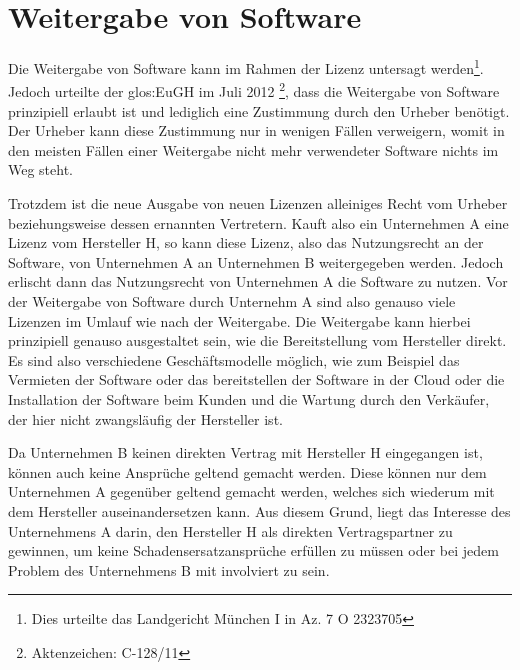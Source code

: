 \section{Weitergabe von Software}
Die Weitergabe von Software kann im Rahmen der Lizenz untersagt werden\footnote{Dies urteilte das Landgericht München I in Az. 7 O 23237\/05}.
Jedoch urteilte der \gls{glos:EuGH} im Juli 2012 \footnote{Aktenzeichen: C-128/11 }, dass die Weitergabe von Software prinzipiell erlaubt ist und lediglich eine Zustimmung durch den Urheber benötigt.
Der Urheber kann diese Zustimmung nur in wenigen Fällen verweigern, womit in den meisten Fällen einer Weitergabe nicht mehr verwendeter Software nichts im Weg steht.\par
Trotzdem ist die neue Ausgabe von neuen Lizenzen alleiniges Recht vom Urheber beziehungsweise dessen ernannten Vertretern.
Kauft also ein Unternehmen A eine Lizenz vom Hersteller H, so kann diese Lizenz, also das Nutzungsrecht an der Software, von Unternehmen A an Unternehmen B weitergegeben werden.
Jedoch erlischt dann das Nutzungsrecht von Unternehmen A die Software zu nutzen.
Vor der Weitergabe von Software durch Unternehm A sind also genauso viele Lizenzen im Umlauf wie nach der Weitergabe.
Die Weitergabe kann hierbei prinzipiell genauso ausgestaltet sein, wie die Bereitstellung vom Hersteller direkt.
Es sind also verschiedene Geschäftsmodelle möglich, wie zum Beispiel das Vermieten der Software oder das bereitstellen der Software in der Cloud oder die Installation der Software beim Kunden und die Wartung durch den Verkäufer, der hier nicht zwangsläufig der Hersteller ist.\par
Da Unternehmen B keinen direkten Vertrag mit Hersteller H eingegangen ist, können auch keine Ansprüche geltend gemacht werden.
Diese können nur dem Unternehmen A gegenüber geltend gemacht werden, welches sich wiederum mit dem Hersteller auseinandersetzen kann.
Aus diesem Grund, liegt das Interesse des Unternehmens A darin, den Hersteller H als direkten Vertragspartner zu gewinnen, um keine Schadensersatzansprüche erfüllen zu müssen oder bei jedem Problem des Unternehmens B mit involviert zu sein.